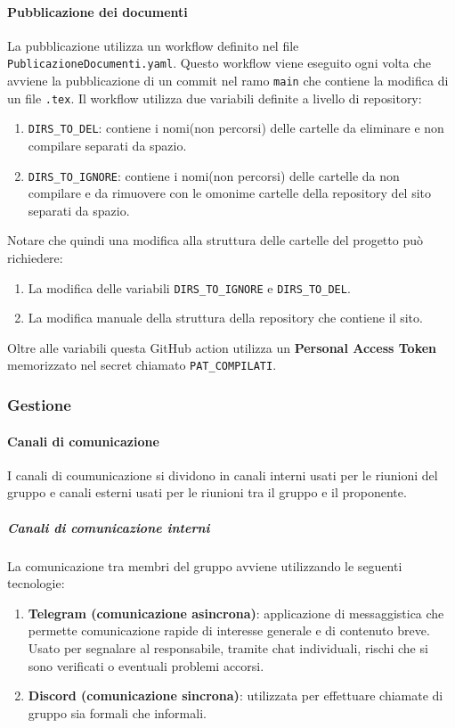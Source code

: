 \paragraph{Pubblicazione dei documenti}
\label{par:pubblicazione_documenti}
La pubblicazione utilizza un workflow definito nel file \texttt{PublicazioneDocumenti.yaml}.
Questo workflow viene eseguito ogni volta che avviene la pubblicazione di un commit nel ramo \texttt{main} che contiene la modifica di un file \texttt{.tex}.
Il workflow utilizza due variabili definite a livello di repository:
\begin{enumerate}
    \item \texttt{DIRS\_TO\_DEL}: contiene i nomi(non percorsi) delle cartelle da eliminare e non compilare separati da spazio.
    \item \texttt{DIRS\_TO\_IGNORE}: contiene i nomi(non percorsi) delle cartelle da non compilare e da rimuovere con le omonime cartelle della repository del sito separati da spazio.
\end{enumerate}
Notare che quindi una modifica alla struttura delle cartelle del progetto può richiedere:
\begin{enumerate}
    \item La modifica delle variabili \texttt{DIRS\_TO\_IGNORE} e \texttt{DIRS\_TO\_DEL}.
    \item La modifica manuale della struttura della repository che contiene il sito.
\end{enumerate}
Oltre alle variabili questa GitHub action utilizza un \textbf{Personal Access Token} memorizzato nel secret chiamato \texttt{PAT\_COMPILATI}.

\subsubsection{Gestione}
\paragraph{Canali di comunicazione}
I canali di coumunicazione si dividono in canali interni usati per le riunioni del gruppo e canali esterni usati per le riunioni tra il gruppo e il proponente.

\subparagraph{Canali di comunicazione interni}
\label{subpar:canali_interni}
La comunicazione tra membri del gruppo avviene utilizzando le seguenti tecnologie:
\begin{enumerate}
    \item \textbf{Telegram (comunicazione asincrona)}: applicazione di messaggistica che permette comunicazione rapide di interesse generale e di contenuto breve.
    Usato per segnalare al responsabile, tramite chat individuali, rischi che si sono verificati o eventuali problemi accorsi.

    \item \textbf{Discord (comunicazione sincrona)}: utilizzata per effettuare chiamate di gruppo sia formali che informali.
\end{enumerate}

